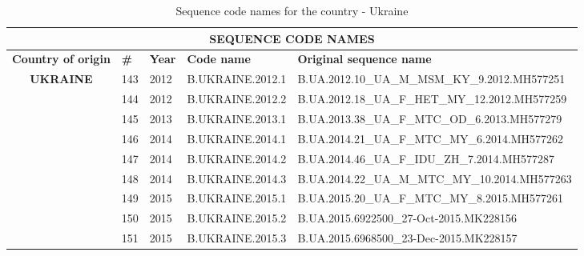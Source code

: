 \begin{table}[htbp]
    \caption{Sequence code names for the country - Ukraine}
    \centering
\begin{tabular}{|cllll|}
\hline
\multicolumn{5}{|c|}{\textbf{SEQUENCE   CODE NAMES}}                                                                                                                                                                       \\ \hline
\multicolumn{1}{|l|}{\textbf{Country   of origin}}      & \multicolumn{1}{l|}{\textbf{\#}} & \multicolumn{1}{r|}{\textbf{Year}} & \multicolumn{1}{l|}{\textbf{Code name}} & \textbf{Original sequence name}                \\ \hline
\multicolumn{1}{|c|}{\multirow{9}{*}{\textbf{UKRAINE}}} & \multicolumn{1}{l|}{143}         & \multicolumn{1}{l|}{2012}          & \multicolumn{1}{l|}{B.UKRAINE.2012.1}   & B.UA.2012.10\_UA\_M\_MSM\_KY\_9.2012.MH577251  \\ \cline{2-5} 
\multicolumn{1}{|c|}{}                                  & \multicolumn{1}{l|}{144}         & \multicolumn{1}{l|}{2012}          & \multicolumn{1}{l|}{B.UKRAINE.2012.2}   & B.UA.2012.18\_UA\_F\_HET\_MY\_12.2012.MH577259 \\ \cline{2-5} 
\multicolumn{1}{|c|}{}                                  & \multicolumn{1}{l|}{145}         & \multicolumn{1}{l|}{2013}          & \multicolumn{1}{l|}{B.UKRAINE.2013.1}   & B.UA.2013.38\_UA\_F\_MTC\_OD\_6.2013.MH577279  \\ \cline{2-5} 
\multicolumn{1}{|c|}{}                                  & \multicolumn{1}{l|}{146}         & \multicolumn{1}{l|}{2014}          & \multicolumn{1}{l|}{B.UKRAINE.2014.1}   & B.UA.2014.21\_UA\_F\_MTC\_MY\_6.2014.MH577262  \\ \cline{2-5} 
\multicolumn{1}{|c|}{}                                  & \multicolumn{1}{l|}{147}         & \multicolumn{1}{l|}{2014}          & \multicolumn{1}{l|}{B.UKRAINE.2014.2}   & B.UA.2014.46\_UA\_F\_IDU\_ZH\_7.2014.MH577287  \\ \cline{2-5} 
\multicolumn{1}{|c|}{}                                  & \multicolumn{1}{l|}{148}         & \multicolumn{1}{l|}{2014}          & \multicolumn{1}{l|}{B.UKRAINE.2014.3}   & B.UA.2014.22\_UA\_M\_MTC\_MY\_10.2014.MH577263 \\ \cline{2-5} 
\multicolumn{1}{|c|}{}                                  & \multicolumn{1}{l|}{149}         & \multicolumn{1}{l|}{2015}          & \multicolumn{1}{l|}{B.UKRAINE.2015.1}   & B.UA.2015.20\_UA\_F\_MTC\_MY\_8.2015.MH577261  \\ \cline{2-5} 
\multicolumn{1}{|c|}{}                                  & \multicolumn{1}{l|}{150}         & \multicolumn{1}{l|}{2015}          & \multicolumn{1}{l|}{B.UKRAINE.2015.2}   & B.UA.2015.6922500\_27-Oct-2015.MK228156        \\ \cline{2-5} 
\multicolumn{1}{|c|}{}                                  & \multicolumn{1}{l|}{151}         & \multicolumn{1}{l|}{2015}          & \multicolumn{1}{l|}{B.UKRAINE.2015.3}   & B.UA.2015.6968500\_23-Dec-2015.MK228157        \\ \hline
\end{tabular}
\end{table}



